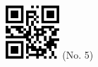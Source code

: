 \documentclass[twocolumn]{article}
\title{}
\date{}
\begin{document}

\begin{center}
 \hspace{0.2cm}
 \includegraphics[width=2cm]{qrcode-5.png}
 \hspace{0.5cm}
 \Large{  (No. 5) }
\end{center}


\end{document}
